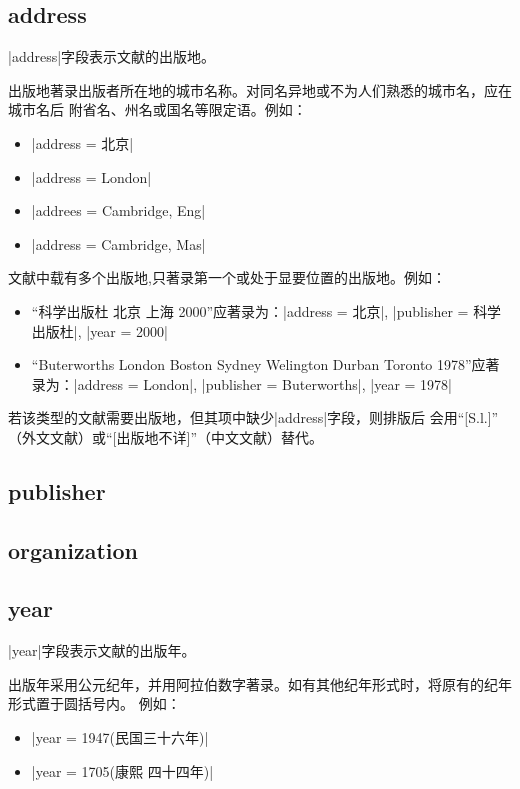 \subsection{address}\label{subsec:bibfield-address}

|address|字段表示文献的出版地。

出版地著录出版者所在地的城市名称。对同名异地或不为人们熟悉的城市名，应在城市名后
附省名、州名或国名等限定语。例如：
\begin{itemize}
\item |address = {北京}|
\item |address = {London}|
\item |addrees = {Cambridge, Eng}|
\item |address = {Cambridge, Mas}|
\end{itemize}

文献中载有多个出版地,只著录第一个或处于显要位置的出版地。例如：
\begin{itemize}
\item ``科学出版杜 北京 上海 2000''应著录为：|address = {北京}|, 
  |publisher = {科学出版杜}|, |year = {2000}|
\item ``Buterworths London Boston Sydney Welington Durban Toronto 1978''应著
  录为：|address = {London}|, |publisher = {Buterworths}|, |year = {1978}|
\end{itemize}

若该类型的文献需要出版地，但其{\BibTeX}项中缺少|address|字段，则{\BibTeX}排版后
会用``[S.l.]'' （外文文献）或``[出版地不详]''（中文文献）替代。

\subsection{publisher}\label{subsec:bibfield-publisher}

\subsection{organization}\label{subsec:bibfield-organization}

\subsection{year}\label{subsec:bibfield-year}

|year|字段表示文献的出版年。

出版年采用公元纪年，并用阿拉伯数字著录。如有其他纪年形式时，将原有的纪年形式置于圆括号内。
例如：
\begin{itemize}
\item |year = {1947(民国三十六年)}|
\item |year = {1705(康熙 四十四年)}|
\end{itemize}

